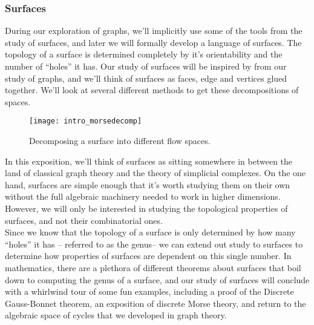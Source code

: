 \subsubsection{Surfaces}

During our exploration of graphs,  we'll implicitly use some of the tools from the study of surfaces, and later we will formally develop a language of surfaces. The topology of a surface is determined completely by it's orientability and the number of ``holes'' it has. Our study of surfaces will be inspired by from our study of graphs, and we'll think of surfaces as faces, edge and vertices glued together. We'll look at several different methods to get these decompositions of spaces.  
\begin{wrapfigure}{r}{5cm}
\centering
\texttt{[image: intro\_morsedecomp]}
\caption{Decomposing a surface into different flow spaces.}
\label{fig:morsedecomp}
\end{wrapfigure}
In this exposition, we'll think of surfaces as sitting somewhere in between the land of classical graph theory and the theory of simplicial complexes. On the one hand, surfaces are simple enough that it's worth studying them on their own without the full algebraic machinery needed to work in higher dimensions. However, we will only be interested in studying the topological properties of surfaces, and not their combinatorial ones. \\
Since we know that the topology of a surface is only determined by how many ``holes'' it has -- referred to as the genus-- we can extend out study to surfaces to determine how properties of surfaces are  dependent on this single number. In mathematics, there are a plethora of different theorems about surfaces that boil down to computing the genus of a surface, and our study of surfaces will conclude with a whirlwind tour of some fun examples, including a proof of the Discrete Gauss-Bonnet theorem, an exposition of discrete Morse theory, and return to the algebraic space of cycles that we  developed in graph theory. 
